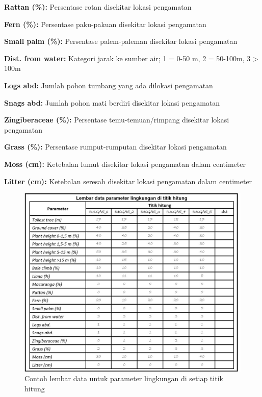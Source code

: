 \documentclass[
]{book}
\begin{document}
\textbf{Rattan (\%):} Persentase rotan disekitar lokasi pengamatan

\textbf{Fern (\%):} Persentase paku-pakuan disekitar lokasi pengamatan

\textbf{Small palm (\%):} Persentase palem-paleman disekitar lokasi pengamatan

\textbf{Dist. from water:} Kategori jarak ke sumber air; 1 = 0-50 m, 2 = 50-100m, 3 \textgreater{} 100m

\textbf{Logs abd:} Jumlah pohon tumbang yang ada dilokasi pengamatan

\textbf{Snags abd:} Jumlah pohon mati berdiri disekitar lokasi pengamatan

\textbf{Zingiberaceae (\%):} Persentase temu-temuan/rimpang disekitar lokasi pengamatan

\textbf{Grass (\%):} Persentase rumput-rumputan disekitar lokasi pengamatan

\textbf{Moss (cm):} Ketebalan lumut disekitar lokasi pengamatan dalam centimeter

\textbf{Litter (cm):} Ketebalan seresah disekitar lokasi pengamatan dalam centimeter

\begin{figure}

{\centering \includegraphics[width=1\linewidth]{images/ldp_pl} 

}

\caption{Contoh lembar data untuk parameter lingkungan di setiap titik hitung}\label{fig:ldppl}
\end{figure}
\end{document}
